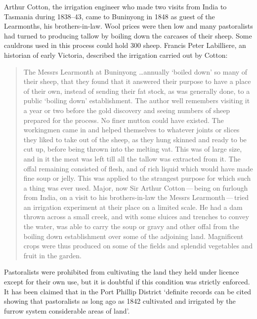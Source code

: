 Arthur Cotton,  the irrigation engineer who made two
visits from India to Tasmania during 1838--43, came to Buninyong in
1848 as guest of the Learmonths, his brothers-in-law.  Wool
 prices were then low and many pastoralists had turned to
producing tallow  by boiling down the carcases of their
sheep.  Some cauldrons used in this process could hold 300
sheep.  Francis Peter Labilliere,
 an
historian of early Victoria, described the irrigation carried out by
Cotton:
\begin{quote}
	The Messrs Learmonth at Buninyong \ldots annually `boiled
	down' so many of their sheep, that they found that it answered
	their purpose to have a place of their own, instead of sending
	their fat stock, as was generally done, to a public `boiling
	down' establishment.  The author well remembers visiting it a
	year or two before the gold discovery and seeing numbers of
	sheep prepared for the process.  No finer mutton could have
	existed.  The workingmen came in and helped themselves to
	whatever joints or slices they liked to take out of the sheep,
	as they hung skinned and ready to be cut up, before being
	thrown into the melting vat.  This was of large size, and in
	it the meat was left till all the tallow was extracted from
	it.  The offal remaining consisted of flesh, and of rich
	liquid which would have made fine soup or jelly.  This was
	applied to the strangest purpose for which such a thing was
	ever used.  Major, now Sir Arthur Cotton\,---\,being on
	furlough from India, on a visit to his brothers-in-law the
	Messrs Learmonth\,---\,tried an irrigation experiment at their
	place on a limited scale.  He had a dam thrown across a small
	creek, and with some sluices and trenches to convey the water,
	was able to carry the soup or gravy and other offal from the
	boiling down establishment over some of the adjoining land.
	Magnificent crops were thus produced on some of the fields and
	splendid vegetables and fruit in the
	garden.
\end{quote}

Pastoralists were prohibited from cultivating the land they held under
licence except for their own use, but it is doubtful if this condition
was strictly enforced.  It has been claimed that in the Port Phillip
District `definite records can be cited showing that pastoralists as
long ago as 1842 cultivated and irrigated by the furrow system
considerable areas of land'.

